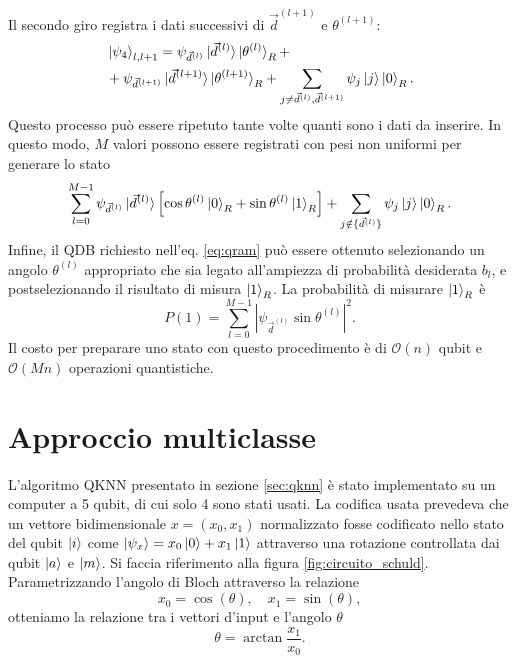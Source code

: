 Il secondo giro registra i dati successivi di $\vec{d}^{(l+1)}$ e $\theta^{(l+1)}$: 
\begin{equation}
    \begin{split}
        &\ket{\psi_4}_{l,l+1} = \psi_{\vec{d}^{(l)}} \ket{\vec{d}^{(l)}} \ket{\theta^{(l)}}_R + \\
        &+ \psi_{\vec{d}^{(l+1)}} \ket{\vec{d}^{(l+1)}} \ket{\theta^{(l+1)}}_R + 
        \sum_{j \neq \vec{d}^{(l)},\vec{d}^{(l+1)}} \psi_j \ket{j} \ket{0}_R.
    \end{split}
\end{equation}
Questo processo può essere ripetuto tante volte quanti sono i dati da inserire. 
In questo modo, $M$ valori possono essere registrati con pesi non uniformi per 
generare lo stato 
\begin{equation}
    \sum_{l=0}^{M-1} \psi_{\vec{d}^{(l)}} \ket{\vec{d}^{(l)}} \left[ \cos\theta^{(l)} 
    \ket{0}_R + \sin\theta^{(l)} \ket{1}_R \right] + 
    \sum_{j \notin \{ \vec{d}^{(l)} \}} \psi_j \ket{j} \ket{0}_R.
\end{equation}
Infine, il \ac{QDB} richiesto nell'eq. \ref{eq:qram} può essere ottenuto 
selezionando un angolo $\theta^{(l)}$ appropriato che sia legato all'ampiezza di 
probabilità desiderata $b_l$, e postselezionando il risultato di misura $\ket{1}_R$. 
La probabilità di misurare $\ket{1}_R$ è 
\begin{equation} \label{eq:qram.prob}
    P(1) = \sum_{l=0}^{M-1} |\psi_{\vec{d}^{(l)}} \sin\theta^{(l)} |^2.
\end{equation}
Il costo per preparare uno stato con questo procedimento è di 
$\mathcal{O}(n)$ qubit e $\mathcal{O}(Mn)$ operazioni quantistiche. 

\section{Approccio multiclasse}

L'algoritmo \ac{QKNN} presentato in sezione \ref{sec:qknn} è stato implementato 
su un computer a 5 qubit, di cui solo 4 sono stati usati. La codifica usata prevedeva 
che un vettore bidimensionale $x = (x_0,x_1)$ normalizzato fosse codificato nello stato del 
qubit $\ket{i}$ come $\ket{\psi_x} = x_0 \ket{0} + x_1 \ket{1}$ attraverso una rotazione 
controllata dai qubit $\ket{a}$ e $\ket{m}$. Si faccia riferimento alla figura 
\ref{fig:circuito_schuld}. Parametrizzando l'angolo di Bloch attraverso la relazione 
\begin{equation}
    x_0 = \cos(\theta), \quad x_1 = \sin(\theta),
\end{equation}
otteniamo la relazione tra i vettori d'input e l'angolo $\theta$
\begin{equation}
    \theta = \arctan\frac{x_1}{x_0}. 
\end{equation}

